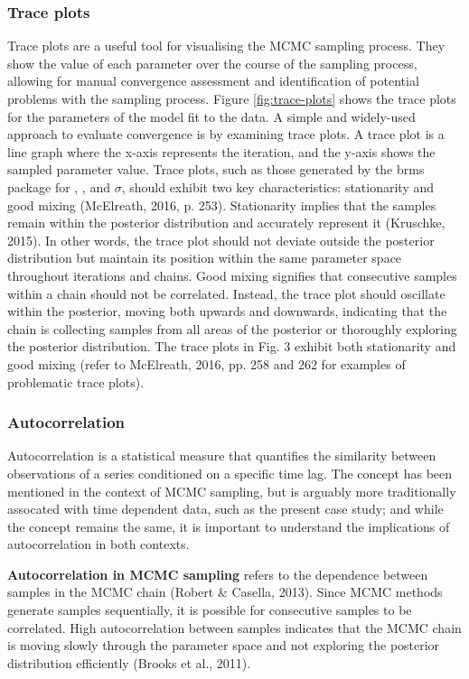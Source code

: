 \subsubsection{Trace plots}

Trace plots are a useful tool for visualising the MCMC sampling process. They 
show the value of each parameter over the course of the sampling process, 
allowing for manual convergence assessment and identification of potential problems with
the sampling process. Figure \ref{fig:trace-plots} shows the trace plots for 
the parameters of the model fit to the data.
A simple and widely-used approach to evaluate convergence is by examining trace plots. A trace plot is a line graph where the x-axis represents the iteration, and the y-axis shows the sampled parameter value. Trace plots, such as those generated by the brms package for , , and $\sigma$, should exhibit two key characteristics: stationarity and good mixing (McElreath, 2016, p. 253). Stationarity implies that the samples remain within the posterior distribution and accurately represent it (Kruschke, 2015). In other words, the trace plot should not deviate outside the posterior distribution but maintain its position within the same parameter space throughout iterations and chains. Good mixing signifies that consecutive samples within a chain should not be correlated. Instead, the trace plot should oscillate within the posterior, moving both upwards and downwards, indicating that the chain is collecting samples from all areas of the posterior or thoroughly exploring the posterior distribution. The trace plots in Fig. 3 exhibit both stationarity and good mixing (refer to McElreath, 2016, pp. 258 and 262 for examples of problematic trace plots).

\subsubsection{Autocorrelation} 
Autocorrelation is a statistical measure that quantifies the similarity between
observations of a series conditioned on a specific time lag. The concept
has been mentioned in the context of MCMC sampling, but is arguably more
traditionally assocated with time dependent data, such as the present case
study; and while the concept remains the same, it is important to understand the 
implications of autocorrelation in both contexts. 

\textbf{Autocorrelation in MCMC sampling}  refers to the dependence between
samples in the MCMC chain (Robert \& Casella, 2013). Since MCMC methods generate
samples sequentially, it is possible for consecutive samples to be correlated.
High autocorrelation between samples indicates that the MCMC chain is moving
slowly through the parameter space and not exploring the posterior distribution
efficiently (Brooks et al., 2011).

